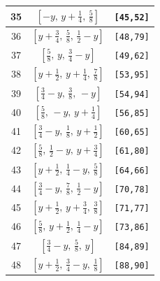 \documentclass[fleqn,8pt]{jsarticle}
\begin{document}
\begin{longtable}{ccc}
35 & $\left[ - y,\, y + \frac{1}{4},\, \frac{5}{8} \right]$ & {\tt [45,52]} \\ \hline
36 & $\left[ y + \frac{3}{4},\, \frac{5}{8},\, \frac{1}{2} - y \right]$ & {\tt [48,79]} \\ \hline
37 & $\left[ \frac{5}{8},\, y,\, \frac{3}{4} - y \right]$ & {\tt [49,62]} \\ \hline
38 & $\left[ y + \frac{1}{2},\, y + \frac{1}{4},\, \frac{7}{8} \right]$ & {\tt [53,95]} \\ \hline
39 & $\left[ \frac{3}{4} - y,\, \frac{3}{8},\, - y \right]$ & {\tt [54,94]} \\ \hline
40 & $\left[ \frac{5}{8},\, - y,\, y + \frac{1}{4} \right]$ & {\tt [56,85]} \\ \hline
41 & $\left[ \frac{3}{4} - y,\, \frac{1}{8},\, y + \frac{1}{2} \right]$ & {\tt [60,65]} \\ \hline
42 & $\left[ \frac{5}{8},\, \frac{1}{2} - y,\, y + \frac{3}{4} \right]$ & {\tt [61,80]} \\ \hline
43 & $\left[ y + \frac{1}{2},\, \frac{1}{4} - y,\, \frac{5}{8} \right]$ & {\tt [64,66]} \\ \hline
44 & $\left[ \frac{3}{4} - y,\, \frac{7}{8},\, \frac{1}{2} - y \right]$ & {\tt [70,78]} \\ \hline
45 & $\left[ y + \frac{1}{2},\, y + \frac{3}{4},\, \frac{3}{8} \right]$ & {\tt [71,77]} \\ \hline
46 & $\left[ \frac{5}{8},\, y + \frac{1}{2},\, \frac{1}{4} - y \right]$ & {\tt [73,86]} \\ \hline
47 & $\left[ \frac{3}{4} - y,\, \frac{5}{8},\, y \right]$ & {\tt [84,89]} \\ \hline
48 & $\left[ y + \frac{1}{2},\, \frac{3}{4} - y,\, \frac{1}{8} \right]$ & {\tt [88,90]} \\
\end{longtable}
\renewcommand{\arraystretch}{1.2}
\end{document}

